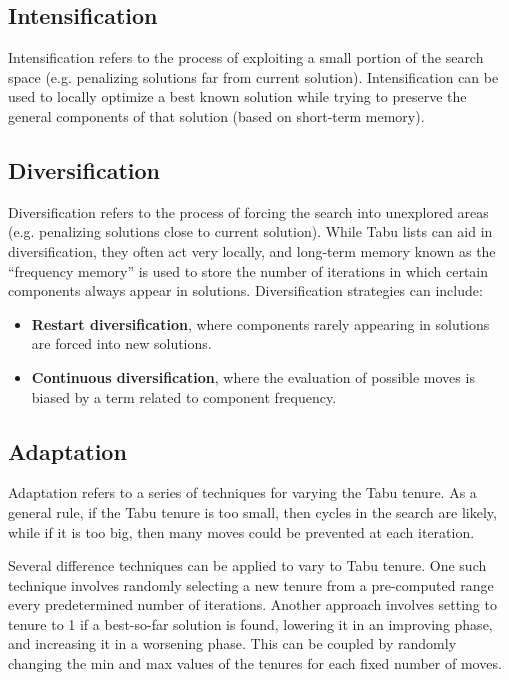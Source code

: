 \documentclass[12pt,titlepage]{article}
\begin{document}
    \subsection{Intensification}
      Intensification refers to the process of exploiting a small portion of the search space (e.g. penalizing solutions far from current solution). Intensification
      can be used to locally optimize a best known solution while trying to preserve the general components of that solution (based on short-term memory).

    \subsection{Diversification}
      Diversification refers to the process of forcing the search into unexplored areas (e.g. penalizing solutions close to current solution). While Tabu lists can aid
      in diversification, they often act very locally, and long-term memory known as the ``frequency memory'' is used to store the number of iterations in which certain
      components always appear in solutions. Diversification strategies can include:
      \begin{itemize}
        \item \textbf{Restart diversification}, where components rarely appearing in solutions are forced into new solutions.
        \item \textbf{Continuous diversification}, where the evaluation of possible moves is biased by a term related to component frequency.
      \end{itemize}

    \subsection{Adaptation}
      Adaptation refers to a series of techniques for varying the Tabu tenure. As a general rule, if the Tabu tenure is too small, then cycles in the search are likely,
      while if it is too big, then many moves could be prevented at each iteration.

      Several difference techniques can be applied to vary to Tabu tenure. One such technique involves randomly selecting a new tenure from a pre-computed range every
      predetermined number of iterations. Another approach involves setting to tenure to 1 if a best-so-far solution is found, lowering it in an improving phase, and
      increasing it in a worsening phase. This can be coupled by randomly changing the min and max values of the tenures for each fixed number of moves.
\end{document}

